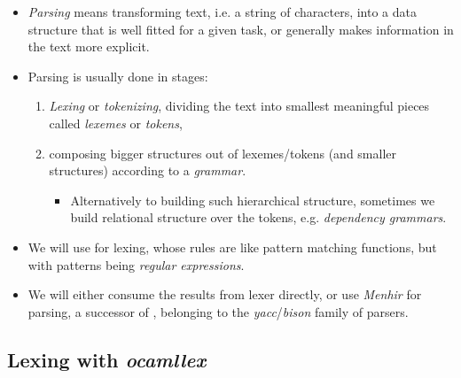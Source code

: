 \documentclass{beamer}
\newcommand{\tmem}[1]{{\em #1\/}}
\newcommand{\tmverbatim}[1]{\text{{\ttfamily{#1}}}}
\begin{document}
\begin{itemize}
  \item {\tmem{Parsing}} means transforming text, i.e. a string of characters,
  into a data structure that is well fitted for a given task, or generally
  makes information in the text more explicit.
  
  \item Parsing is usually done in stages:
  \begin{enumerate}
    \item {\tmem{Lexing}} or {\tmem{tokenizing}}, dividing the text into
    smallest meaningful pieces called {\tmem{lexemes}} or {\tmem{tokens}},
    
    \item composing bigger structures out of lexemes/tokens (and smaller
    structures) according to a {\tmem{grammar}}.
    \begin{itemize}
      \item Alternatively to building such hierarchical structure, sometimes
      we build relational structure over the tokens, e.g. {\tmem{dependency
      gram{\nobreak}mars}}.
    \end{itemize}
  \end{enumerate}
  \item We will use \tmverbatim{ocamllex} for lexing, whose rules are like
  pattern matching functions, but with patterns being {\tmem{regular
  expressions}}.
  
  \item We will either consume the results from lexer directly, or use
  {\tmem{Menhir}} for parsing, a successor of \tmverbatim{ocamlyacc},
  belonging to the {\tmem{yacc}}/{\tmem{bison}} family of parsers.
\end{itemize}

\subsection{Lexing with {\tmem{ocamllex}}}
\end{document}
